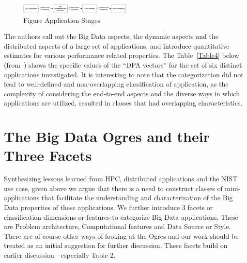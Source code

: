 \documentclass{acm_proc_article-sp}
\begin{document}
\begin{figure}
\centering
\includegraphics[width=0.5\textwidth]{fig1.png}
\caption{Figure Application Stages}
\label{figure1}
\end{figure}

The authors call out the Big Data aspects, the dynamic aspects and the
distributed aspects of a large set of applications, and introduce quantitative
estimates for various performance related properties. The Table~\ref{Table4}
below (from~\cite{b26}) shows the specific values of the ``DPA vectors'' for
the set of six distinct applications investigated. It is interesting to note
that the categorization did not lead to well-defined and non-overlapping
classification of application, as the complexity of considering the end-to-end
aspects and the diverse ways in which applications are utilized, resulted in
classes that had overlapping characteristics.



\section{The Big Data Ogres and their Three Facets}


Synthesizing lessons learned from HPC, distributed applications and the NIST use case, given above we argue that there is a need to construct classes of mini-applications that facilitate the understanding and characterization of the Big Data properties of these applications. We further introduce 3 facets or classification dimensions or features to categorize Big Data applications. These are Problem architecture, Computational features and Data Source or Style. There are of course other ways of looking at the Ogres and our work should be treated as an initial suggestion for further discussion. These facets build on earlier discussion - especially Table 2.
\end{document}
